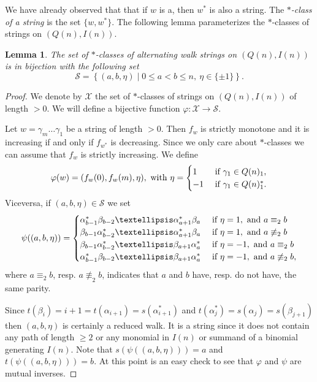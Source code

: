 \documentclass[11pt]{amsart}
\newtheorem{lemma}[theorem]{Lemma}
\theoremstyle{definition}
\begin{document}
We have already observed that that if $w$ is a, then $w^*$ is also a string. The \emph{$*$-class of a string} is the set $\{w, w^*\}$.
The following lemma parameterizes the $*$-classes of strings on $(Q(n), I(n))$.
\begin{lemma}\label{ lemma : parameterisation of strings}%
The set of $*$-classes of alternating walk strings on $(Q(n), I(n))$ is in bijection with the following set
    \[
    \mathscr{S}=\left\{(a,b,\eta)\mid 0\leq a<b\leq n, \ \eta\in \{\pm1\} \right\}.
    \]
\end{lemma}
\begin{proof}
    We denote by $\mathscr{X}$ the set of $*$-classes of strings on $(Q(n), I(n))$ of length $>0$. 
    We will define a bijective function  $\varphi:\mathscr{X}\rightarrow \mathscr{S}$.

    Let $w=\gamma_m\ldots \gamma_1$ be a string of length $>0$. Then $f_w$ is strictly monotone and it is increasing if and only if $f_{w^*}$ is decreasing. Since we only care about $*$-classes we can assume that $f_w$ is strictly increasing. We define 
    \[
    \varphi(w)=(f_w(0), f_w(m), \eta), \hbox{ with }\eta=\begin{cases}
        1&\hbox{ if }\gamma_1\in Q(n)_1,\\
        -1&\hbox{ if }\gamma_1\in Q(n)_1^*.
    \end{cases}
    \]
    Viceversa, if $(a,b,\eta)\in\mathscr{S}$ we set
    \[
 \psi((a,b,\eta))=\begin{cases}
     \alpha_{b-1}^*\beta_{b-2}\ldots\alpha_{a+1}^*\beta_a &\hbox{ if }\eta=1, \hbox{ and }a\equiv_2 b\\
     \beta_{b-1}\alpha_{b-2}^*\ldots\alpha_{a+1}^*\beta_a &\hbox{ if }\eta=1, \hbox{ and }a\not\equiv_2 b\\
     \beta_{b-1}\alpha_{b-2}^*\ldots\beta_{a+1}\alpha_a^* &\hbox{ if }\eta=-1, \hbox{ and }a\equiv_2 b\\
     \alpha_{b-1}^*\beta_{b-2}\ldots\beta_{a+1}\alpha_{a}^* &\hbox{ if }\eta=-1, \hbox{ and }a\not\equiv_2 b,
 \end{cases}
    \]
    where $a\equiv_2 b$, resp. $a\not\equiv_2 b$, indicates that $a$ and $b$ have, resp. do not have, the same parity.
    
  Since $t(\beta_i)=i+1=t(\alpha_{i+1})=s(\alpha_{i+1}^*)$ and $t(\alpha_j^*)=s(\alpha_j)=s(\beta_{j+1})$ then $(a,b,\eta)$ is certainly a reduced walk. It is a string since it does not contain any path of length $\geq 2$ or any monomial in $I(n)$ or summand of a binomial generating $I(n)$. Note that $s(\psi((a,b,\eta)))=a$ and $t(\psi((a,b,\eta)))=b$. At this point is an easy check to see that $\varphi$ and $\psi$ are mutual inverses.
\end{proof}
\end{document}
